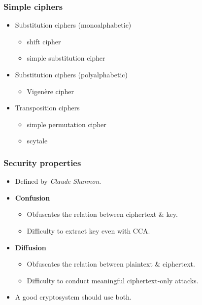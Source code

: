 \begin{frame}
  \frametitle{Simple ciphers}

  \pause
  \begin{itemize}
    \item Substitution ciphers (monoalphabetic)
    \begin{itemize}
      \item shift cipher
      \item simple substitution cipher
    \end{itemize}
    \pause
    \item Substitution ciphers (polyalphabetic)
    \begin{itemize}
      \item Vigenère cipher
    \end{itemize}
    \pause
    \item Transposition ciphers
    \begin{itemize}
      \item simple permutation cipher
      \item scytale
    \end{itemize}
  \end{itemize}
\end{frame}

\begin{frame}
  \frametitle{Security properties}

  \pause
  \begin{itemize}
    \item Defined by \emph{Claude Shannon}.
    
    \vspace*{1em}

    \pause
    \item \textbf{Confusion}
    \begin{itemize}
      \item Obfuscates the relation between ciphertext \& key.
      \item Difficulty to extract key even with CCA.
    \end{itemize}

    \vspace*{1em}

    \pause
    \item \textbf{Diffusion}
    \begin{itemize}
      \item Obfuscates the relation between plaintext \& ciphertext.
      \item Difficulty to conduct meaningful ciphertext-only attacks.
    \end{itemize}

    \vspace*{1em}

    \pause
    \item A good cryptosystem should use both.
  \end{itemize}
\end{frame}


